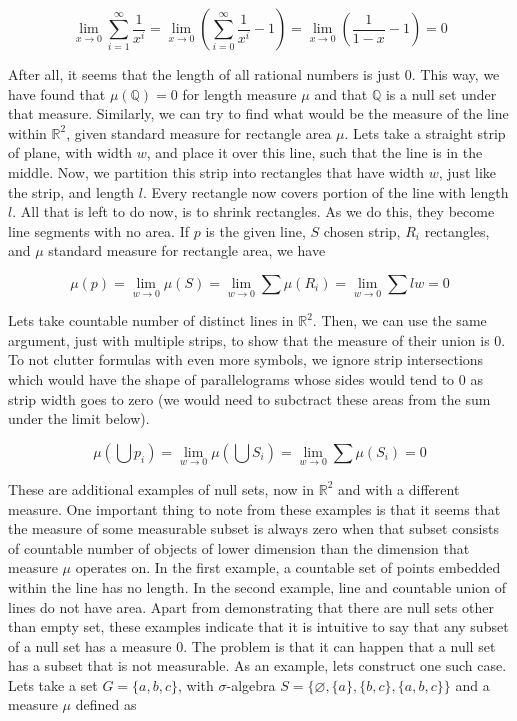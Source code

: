 \documentclass{article}
\begin{document}
\[ \lim_{x \to 0}\sum_{i=1}^{\infty}\frac{1}{x^i}=\lim_{x \to 0}(\sum_{i=0}^{\infty}\frac{1}{x^i}-1)=\lim_{x \to 0} (\frac{1}{1-x} - 1)=0 \]

After all, it seems that the length of all rational numbers is just 0. This way, we have found that $\mu(\mathbb{Q})=0$ for length measure $\mu$ and that $\mathbb{Q}$ is a null set under that measure.
\newline\indent Similarly, we can try to find what would be the measure of the line within $\mathbb{R}^2$, given standard measure for rectangle area $\mu$. Lets take a straight strip of plane, with width $w$, and place it over this line, such that the line is in the middle. Now, we partition this strip into rectangles that have width $w$, just like the strip, and length $l$. Every rectangle now covers portion of the line with length $l$. All that is left to do now, is to shrink rectangles. As we do this, they become line segments with no area. If $p$ is the given line, $S$ chosen strip, $R_i$ rectangles, and $\mu$ standard measure for rectangle area, we have

\[\mu(p)=\lim_{w \to 0}\mu(S)=\lim_{w \to 0}\sum\mu(R_i)=\lim_{w \to 0}\sum lw=0\]

Lets take countable number of distinct lines in $\mathbb{R}^2$. Then, we can use the same argument, just with multiple strips, to show that the measure of their union is 0. To not clutter formulas with even more symbols, we ignore strip intersections which would have the shape of parallelograms whose sides would tend to 0 as strip width goes to zero (we would need to subctract these areas from the sum under the limit below).

\[ \mu(\bigcup p_i) = \lim_{w \to 0}\mu(\bigcup S_i) = \lim_{w \to 0}\sum\mu(S_i) = 0 \]

These are additional examples of null sets, now in $\mathbb{R}^2$ and with a different measure. One important thing to note from these examples is that it seems that the measure of some measurable subset is always zero when that subset consists of countable number of objects of lower dimension than the dimension that measure $\mu$ operates on. In the first example, a countable set of points embedded within the line has no length. In the second example, line and countable union of lines do not have area. 
\newline\indent Apart from demonstrating that there are null sets other than empty set, these examples indicate that it is intuitive to say that any subset of a null set has a measure 0. The problem is that it can happen that a null set has a subset that is not measurable. As an example, lets construct one such case. Lets take a set $G=\{a,b,c\}$, with $\sigma$-algebra $S=\{\varnothing, \{a\},\{b,c\},\{a,b,c\}\}$ and a measure $\mu$ defined as
\end{document}
